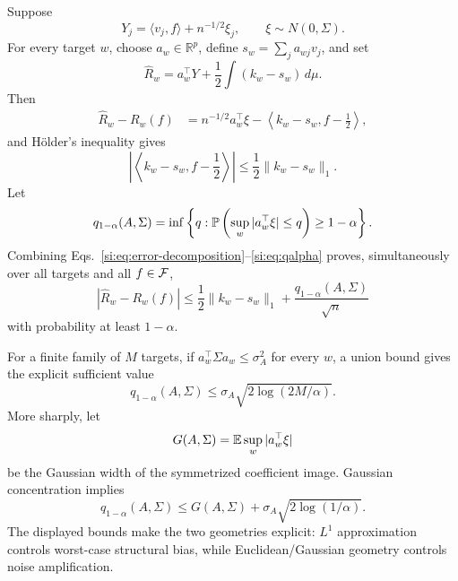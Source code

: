 Suppose
\begin{equation}
Y_j=\langle v_j,f\rangle+n^{-1/2}\xi_j,
\qquad \xi\sim N(0,\Sigma).
\label{si:eq:noisy-model}
\end{equation}
For every target $w$, choose $a_w\in\mathbb R^p$, define $s_w=\sum_ja_{wj}v_j$, and set
\begin{equation}
\widehat R_w=a_w^\top Y+\frac12\int(k_w-s_w)\,d\mu.
\label{si:eq:noisy-estimator}
\end{equation}
Then
\begin{align}
\widehat R_w-R_w(f)
&=n^{-1/2}a_w^\top\xi
-\left\langle k_w-s_w,f-\frac12\right\rangle,
\label{si:eq:error-decomposition}
\end{align}
and H\"older's inequality gives
\begin{equation}
\left|\left\langle k_w-s_w,f-\frac12\right\rangle\right|
\le\frac12\|k_w-s_w\|_1.
\label{si:eq:biasbound}
\end{equation}
Let
\begin{equation}
q_{1-\alpha}(A,\Sigma)
=\inf\left\{q:\mathbb{P}\left(\sup_w|a_w^\top\xi|\le q\right)\ge1-\alpha\right\}.
\label{si:eq:qalpha}
\end{equation}
Combining Eqs.~\ref{si:eq:error-decomposition}--\ref{si:eq:qalpha} proves, simultaneously over all targets and all $f\in\mathcal F$,
\begin{equation}
|\widehat R_w-R_w(f)|
\le\frac12\|k_w-s_w\|_1+\frac{q_{1-\alpha}(A,\Sigma)}{\sqrt n}
\label{si:eq:simband}
\end{equation}
with probability at least $1-\alpha$.

For a finite family of $M$ targets, if $a_w^\top\Sigma a_w\le\sigma_A^2$ for every $w$, a union bound gives the explicit sufficient value
\begin{equation}
q_{1-\alpha}(A,\Sigma)
\le\sigma_A\sqrt{2\log(2M/\alpha)}.
\label{si:eq:unionq}
\end{equation}
More sharply, let
\begin{equation}
G(A,\Sigma)=\mathbb{E}\sup_w|a_w^\top\xi|
\label{si:eq:gaussianwidth}
\end{equation}
be the Gaussian width of the symmetrized coefficient image. Gaussian concentration implies
\begin{equation}
q_{1-\alpha}(A,\Sigma)
\le G(A,\Sigma)+\sigma_A\sqrt{2\log(1/\alpha)}.
\label{si:eq:borell}
\end{equation}
The displayed bounds make the two geometries explicit: $L^1$ approximation controls worst-case structural bias, while Euclidean/Gaussian geometry controls noise amplification.

